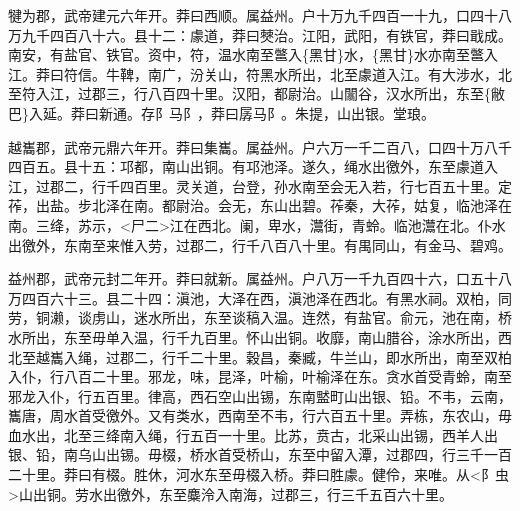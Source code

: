 \documentclass[]{article}
\begin{document}
犍为郡，武帝建元六年开。莽曰西顺。属益州。户十万九千四百一十九，口四十八万九千四百八十六。县十二：豦道，莽曰僰治。江阳，武阳，有铁官，莽曰戢成。南安，有盐官、铁官。资中，符，温水南至鄨入\{黑甘\}水，\{黑甘\}水亦南至鄨入江。莽曰符信。牛鞞，南广，汾关山，符黑水所出，北至豦道入江。有大涉水，北至符入江，过郡三，行八百四十里。汉阳，都尉治。山闟谷，汉水所出，东至\{敝巴\}入延。莽曰新通。存阝马阝，莽曰孱马阝。朱提，山出银。堂琅。

越巂郡，武帝元鼎六年开。莽曰集巂。属益州。户六万一千二百八，口四十万八千四百五。县十五：邛都，南山出铜。有邛池泽。遂久，绳水出徼外，东至豦道入江，过郡二，行千四百里。灵关道，台登，孙水南至会无入若，行七百五十里。定莋，出盐。步北泽在南。都尉治。会无，东山出碧。莋秦，大莋，姑复，临池泽在南。三绛，苏示，\textless{}尸二\textgreater{}江在西北。阑，卑水，灊街，青蛉。临池灊在北。仆水出徼外，东南至来惟入劳，过郡二，行千八百八十里。有禺同山，有金马、碧鸡。

益州郡，武帝元封二年开。莽曰就新。属益州。户八万一千九百四十六，口五十八万四百六十三。县二十四：滇池，大泽在西，滇池泽在西北。有黑水祠。双柏，同劳，铜濑，谈虏山，迷水所出，东至谈稿入温。连然，有盐官。俞元，池在南，桥水所出，东至毋单入温，行千九百里。怀山出铜。收靡，南山腊谷，涂水所出，西北至越巂入绳，过郡二，行千二十里。穀昌，秦臧，牛兰山，即水所出，南至双柏入仆，行八百二十里。邪龙，味，昆泽，叶榆，叶榆泽在东。贪水首受青蛉，南至邪龙入仆，行五百里。律高，西石空山出锡，东南盢町山出银、铅。不韦，云南，巂唐，周水首受徼外。又有类水，西南至不韦，行六百五十里。弄栋，东农山，毋血水出，北至三绛南入绳，行五百一十里。比苏，贲古，北采山出锡，西羊人出银、铅，南乌山出锡。毋棳，桥水首受桥山，东至中留入潭，过郡四，行三千一百二十里。莽曰有棳。胜休，河水东至毋棳入桥。莽曰胜豦。健伶，来唯。从\textless{}阝虫\textgreater{}山出铜。劳水出徼外，东至麋泠入南海，过郡三，行三千五百六十里。
\end{document}
